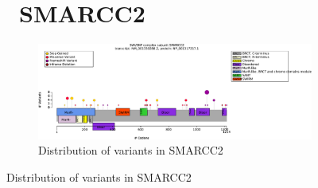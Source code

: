 \begin{figure}[htbp]
\section*{ SMARCC2}
\centering
\begin{subfigure}[b]{0.95\textwidth}
\centering
\includegraphics[width=\textwidth]{ img/SMARCC2_protein_diagram.pdf} 
\captionsetup{justification=raggedright,singlelinecheck=false}
\caption{Distribution of variants in SMARCC2}
\end{subfigure}

\vspace{2em}


\end{figure}
